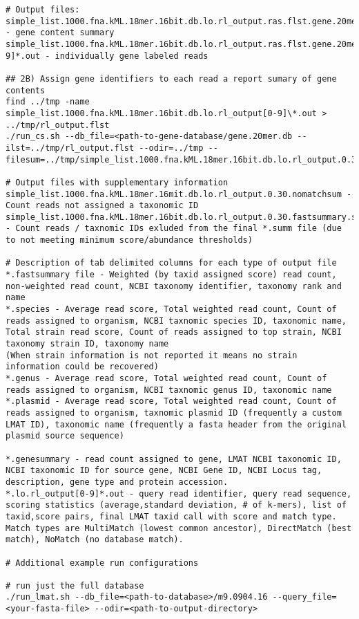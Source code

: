 \documentclass[11pt]{article}
\begin{document}
\begin{verbatim}
# Output files:
simple_list.1000.fna.kML.18mer.16bit.db.lo.rl_output.ras.flst.gene.20mer.db.rl_output.0.01.20.genesummary - gene content summary
simple_list.1000.fna.kML.18mer.16bit.db.lo.rl_output.ras.flst.gene.20mer.db.rl_output[0-9]*.out - individually gene labeled reads

## 2B) Assign gene identifiers to each read a report sumary of gene contents
find ../tmp -name simple_list.1000.fna.kML.18mer.16bit.db.lo.rl_output[0-9]\*.out > ../tmp/rl_output.flst
./run_cs.sh --db_file=<path-to-gene-database/gene.20mer.db --ilst=../tmp/rl_output.flst --odir=../tmp --filesum=../tmp/simple_list.1000.fna.kML.18mer.16bit.db.lo.rl_output.0.30.fastsummary

# Output files with supplementary information
simple_list.1000.fna.kML.18mer.16mit.db.lo.rl_output.0.30.nomatchsum - Count reads not assigned a taxonomic ID
simple_list.1000.fna.kML.18mer.16bit.db.lo.rl_output.0.30.fastsummary.summ.leftover - Count reads / taxnomic IDs exluded from the final *.summ file (due to not meeting minimum score/abundance thresholds)

# Description of tab delimited columns for each type of output file
*.fastsummary file - Weighted (by taxid assigned score) read count, non-weighted read count, NCBI taxonomy identifier, taxonomy rank and name
*.species - Average read score, Total weighted read count, Count of reads assigned to organism, NCBI taxnomic species ID, taxonomic name, Total strain read score, Count of reads assigned to top strain, NCBI taxonomy strain ID, taxonomy name
(When strain information is not reported it means no strain information could be recovered)
*.genus - Average read score, Total weighted read count, Count of reads assigned to organism, NCBI taxnomic genus ID, taxonomic name
*.plasmid - Average read score, Total weighted read count, Count of reads assigned to organism, taxnomic plasmid ID (frequently a custom LMAT ID), taxonomic name (frequently a fasta header from the original plasmid source sequence)

*.genesummary - read count assigned to gene, LMAT NCBI taxonomic ID, NCBI taxonomic ID for source gene, NCBI Gene ID, NCBI Locus tag, description, gene type and protein accession.
*.lo.rl_output[0-9]*.out - query read identifier, query read sequence, scoring statistics (average,standard deviation, # of k-mers), list of taxid,score pairs, final LMAT taxid call with score and match type. Match types are MultiMatch (lowest common ancestor), DirectMatch (best match), NoMatch (no database match).

# Additional example run configurations

# run just the full database
./run_lmat.sh --db_file=<path-to-database>/m9.0904.16 --query_file=<your-fasta-file> --odir=<path-to-output-directory>
\end{verbatim}
\end{document}
